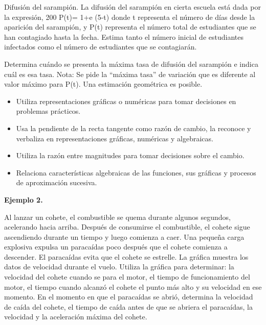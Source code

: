 \ejemplo

Difusión del sarampión. La difusión del sarampión en cierta escuela está dada por la expresión, 200 P(t)= 1+e (5-t) donde t representa el número de días desde la aparición del sarampión, y P(t) representa el número total de estudiantes que se han contagiado hasta la fecha. Estima tanto el número inicial de estudiantes infectados como el número de estudiantes que se contagiarán.

Determina cuándo se presenta la máxima tasa de difusión del sarampión e indica cuál es esa tasa. Nota: Se pide la “máxima tasa” de variación que es diferente al valor máximo para P(t). Una estimación geométrica es posible.



\evidencias

\begin{itemize}
  \item Utiliza representaciones gráficas o numéricas para tomar decisiones en problemas prácticos.
  \item Usa la pendiente de la recta tangente como razón de cambio, la reconoce y verbaliza en representaciones gráficas, numéricas y algebraicas.
  \item Utiliza la razón entre magnitudes para tomar decisiones sobre el cambio.
  \item Relaciona características algebraicas de las funciones, sus gráficas y procesos de aproximación sucesiva.
\end{itemize}

\ejemplo

\textbf{Ejemplo 2.}

Al lanzar un cohete, el combustible se quema durante algunos segundos, acelerando hacia arriba. Después de consumirse el combustible, el cohete sigue ascendiendo durante un tiempo y luego comienza a caer. Una pequeña carga explosiva expulsa un paracaídas poco después que el cohete comienza a descender. El paracaídas evita que el cohete se estrelle. La gráfica muestra los datos de velocidad durante el vuelo. Utiliza la gráfica para determinar: la velocidad del cohete cuando se para el motor, el tiempo de funcionamiento del motor, el tiempo cuando alcanzó el cohete el punto más alto y su velocidad en ese momento. En el momento en que el paracaídas se abrió, determina la velocidad de caída del cohete, el tiempo de caída antes de que se abriera el paracaídas, la velocidad y la aceleración máxima del cohete.

